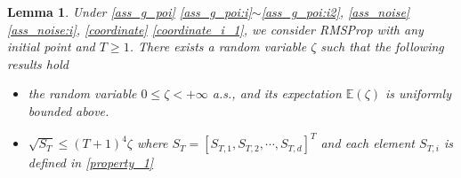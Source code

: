 \documentclass[standalone]{article}
\newtheorem{lem}{Lemma}[section]
\begin{document}
\begin{lem}\label{vital_0}
Under \cref{ass_g_poi} \ref{ass_g_poi:i}$\sim$\ref{ass_g_poi:i2}, \cref{ass_noise} \ref{ass_noise:i}, \cref{coordinate} \ref{coordinate_i_1}, we consider RMSProp with any initial point and $T \geq 1$. There exists a random variable $\zeta$ such that the following results hold
\begin{itemize}
\item[(a)] the random variable $0 \leq \zeta < +\infty$ a.s., and its expectation $\mathbb{E}(\zeta)$ is uniformly bounded above.
\item[(b)] $\sqrt{S_{T}} \leq (T+1)^{4} \zeta$  where $S_T = [S_{T,1}, S_{T,2}, \cdots, S_{T,d}]^T$ and each element $S_{T,i}$ is defined in \cref{property_1}
\end{itemize}
\end{lem}
\end{document}
